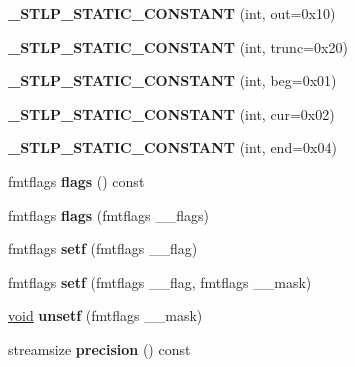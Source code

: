 \begin{DoxyCompactItemize}
{\bfseries \+\_\+\+S\+T\+L\+P\+\_\+\+S\+T\+A\+T\+I\+C\+\_\+\+C\+O\+N\+S\+T\+A\+NT} (int, out=0x10)
\item 
\mbox{\label{classios__base_ac7d621764b170d137e426fd6bbc77a4e}} 
{\bfseries \+\_\+\+S\+T\+L\+P\+\_\+\+S\+T\+A\+T\+I\+C\+\_\+\+C\+O\+N\+S\+T\+A\+NT} (int, trunc=0x20)
\item 
\mbox{\label{classios__base_a66f6003529566daf6d61cb8e9679effb}} 
{\bfseries \+\_\+\+S\+T\+L\+P\+\_\+\+S\+T\+A\+T\+I\+C\+\_\+\+C\+O\+N\+S\+T\+A\+NT} (int, beg=0x01)
\item 
\mbox{\label{classios__base_ab718efc5abc54a48b523b7a4b33bc027}} 
{\bfseries \+\_\+\+S\+T\+L\+P\+\_\+\+S\+T\+A\+T\+I\+C\+\_\+\+C\+O\+N\+S\+T\+A\+NT} (int, cur=0x02)
\item 
\mbox{\label{classios__base_ac4f4bba251dc51c7484490abfb71789c}} 
{\bfseries \+\_\+\+S\+T\+L\+P\+\_\+\+S\+T\+A\+T\+I\+C\+\_\+\+C\+O\+N\+S\+T\+A\+NT} (int, end=0x04)
\item 
\mbox{\label{classios__base_a2a73a30a8b157cc1cc92bb55b0a62e4a}} 
fmtflags {\bfseries flags} () const
\item 
\mbox{\label{classios__base_a08a661b70857dc9c330d6ab975981aaf}} 
fmtflags {\bfseries flags} (fmtflags \+\_\+\+\_\+flags)
\item 
\mbox{\label{classios__base_a1fa7c1ac32510bb7f5905de4d9ca8e9b}} 
fmtflags {\bfseries setf} (fmtflags \+\_\+\+\_\+flag)
\item 
\mbox{\label{classios__base_a43aedd1eed519687b0cd51235ebd21b6}} 
fmtflags {\bfseries setf} (fmtflags \+\_\+\+\_\+flag, fmtflags \+\_\+\+\_\+mask)
\item 
\mbox{\label{classios__base_a21868e705677ce3af444724d6f3c7242}} 
\hyperlink{interfacevoid}{void} {\bfseries unsetf} (fmtflags \+\_\+\+\_\+mask)
\item 
\mbox{\label{classios__base_aaa551b1db3b8e6e2fa3c1d65cfc89f68}} 
streamsize {\bfseries precision} () const
\item 

\end{DoxyCompactItemize}
